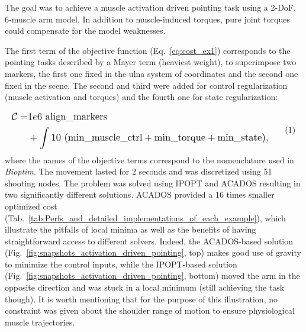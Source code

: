 The goal was to achieve a muscle activation driven pointing task using a 2-DoF, 6-muscle arm model. 
In addition to muscle-induced torques, pure joint torques could compensate for the model weaknesses.

The first term of the objective function (Eq.~\ref{eq:cost_ex1}) corresponds to the pointing tasks described by a Mayer term (heaviest weight), to superimpose two markers, the first one fixed in the ulna system of coordinates and the second one fixed in the scene.
The second and third were added for control regularization (muscle activation and torques) and the fourth one for state regularization:

%
%
\[
\resizebox{0.9\columnwidth}{!}{$
\begin{aligned}
	\mathcal{C} = &1e6~\text{align\_markers}\\
	&+ \int 10~(\text{min\_muscle\_ctrl}+\text{min\_torque}+\text{min\_state}),
\end{aligned}
$}
\addtag
\label{eq:cost_ex1}
\]
%
\noindent where the names of the objective terms correspond to the nomenclature used in \textit{Bioptim}.
The movement lasted for 2 seconds and was discretized using 51 shooting nodes.
The problem was solved using IPOPT and ACADOS resulting in two significantly different solutions.
ACADOS provided a 16 times smaller optimized cost (Tab.~\ref{tab:Perfs_and_detailed_implementations_of_each_example}), which illustrate the pitfalls of local minima as well as the benefits of having straightforward access to different solvers.  
Indeed, the ACADOS-based solution (Fig.~\ref{fig:snapshots_activation_driven_pointing}, top) makes good use of gravity to minimize the control inputs, while the IPOPT-based solution (Fig.~\ref{fig:snapshots_activation_driven_pointing}, bottom) moved the arm in the opposite direction and was stuck in a local minimum (still achieving the task though). 
It is worth mentioning that for the purpose of this illustration, no constraint was given about the shoulder range of motion to ensure physiological muscle trajectories. 

